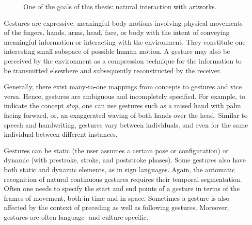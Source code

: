 \begin{figure}[tb]
\centering
{}
\caption{One of the goals of this thesis: natural interaction with artworks.}
\label{fig:interaction}
\end{figure}

Gestures are expressive, meaningful body motions involving physical movements of the fingers, hands, arms, head, face, or
body with the intent of conveying meaningful information or interacting with the environment. They constitute one interesting
small subspace of possible human motion. A gesture may also be perceived by the environment as a compression technique for the information to be transmitted elsewhere and subsequently reconstructed by the receiver.

Generally, there exist many-to-one mappings from concepts
to gestures and vice versa. Hence, gestures are ambiguous and
incompletely specified. For example, to indicate the concept
\textit{stop}, one can use gestures such as a raised hand with palm
facing forward, or, an exaggerated waving of both hands over the
head. Similar to speech and handwriting, gestures vary between
individuals, and even for the same individual between different
instances.

Gestures can be static (the user assumes a certain pose or configuration)
or dynamic (with prestroke, stroke, and poststroke
phases). Some gestures also have both static and dynamic elements,
as in sign languages. Again, the automatic recognition
of natural continuous gestures requires their temporal segmentation.
Often one needs to specify the start and end points of a
gesture in terms of the frames of movement, both in time and
in space. Sometimes a gesture is also affected by the context of
preceding as well as following gestures. Moreover, gestures are
often language- and culture-specific.

